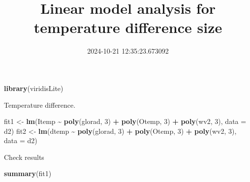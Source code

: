 \documentclass[
]{article}
\title{Linear model analysis for temperature difference size}
\author{}
\date{\vspace{-2.5em}2024-10-21 12:35:23.673092}
\newenvironment{Shaded}{\begin{snugshade}}{\end{snugshade}}
\newcommand{\AttributeTok}[1]{\textcolor[rgb]{0.13,0.29,0.53}{#1}}
\newcommand{\DecValTok}[1]{\textcolor[rgb]{0.00,0.00,0.81}{#1}}
\newcommand{\FunctionTok}[1]{\textcolor[rgb]{0.13,0.29,0.53}{\textbf{#1}}}
\newcommand{\NormalTok}[1]{#1}
\newcommand{\OtherTok}[1]{\textcolor[rgb]{0.56,0.35,0.01}{#1}}
\newcommand{\SpecialCharTok}[1]{\textcolor[rgb]{0.81,0.36,0.00}{\textbf{#1}}}
\begin{document}
\maketitle

\begin{Shaded}
\begin{Highlighting}[]
\FunctionTok{library}\NormalTok{(viridisLite)}
\end{Highlighting}
\end{Shaded}

Temperature difference.

\begin{Shaded}
\end{Shaded}

\begin{Shaded}
\begin{Highlighting}[]
\NormalTok{fit1 }\OtherTok{\textless{}{-}} \FunctionTok{lm}\NormalTok{(Itemp }\SpecialCharTok{\textasciitilde{}} \FunctionTok{poly}\NormalTok{(glorad, }\DecValTok{3}\NormalTok{) }\SpecialCharTok{+} \FunctionTok{poly}\NormalTok{(Otemp, }\DecValTok{3}\NormalTok{) }\SpecialCharTok{+} \FunctionTok{poly}\NormalTok{(wv2, }\DecValTok{3}\NormalTok{), }\AttributeTok{data =}\NormalTok{ d2)}
\NormalTok{fit2 }\OtherTok{\textless{}{-}} \FunctionTok{lm}\NormalTok{(dtemp }\SpecialCharTok{\textasciitilde{}} \FunctionTok{poly}\NormalTok{(glorad, }\DecValTok{3}\NormalTok{) }\SpecialCharTok{+} \FunctionTok{poly}\NormalTok{(Otemp, }\DecValTok{3}\NormalTok{) }\SpecialCharTok{+} \FunctionTok{poly}\NormalTok{(wv2, }\DecValTok{3}\NormalTok{), }\AttributeTok{data =}\NormalTok{ d2)}
\end{Highlighting}
\end{Shaded}

Check results

\begin{Shaded}
\begin{Highlighting}[]
\FunctionTok{summary}\NormalTok{(fit1)}
\end{Highlighting}
\end{Shaded}
\end{document}
